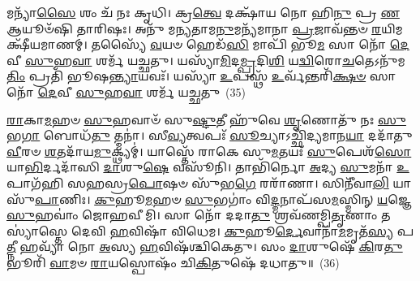 𑌮𑌨𑍍𑌯𑌾᳴\-\ul{𑌸𑍈} 𑌶𑌂 𑌚᳴ 𑌨𑌃 𑌕𑍃𑌧𑌿। 𑌕𑍍𑌰\-\ul{𑌤𑍍𑌵𑍇} 𑌦𑌕𑍍𑌷𑌾᳴𑌯 𑌨𑍋 𑌹𑌿\-\ul{𑌨𑍁} 𑌪𑍍𑌰 \ul{𑌣} 𑌆𑌯𑍂𑍞᳴𑌷𑌿 𑌤𑌾𑌰𑌿𑌷𑌃। 𑌅𑌨𑍁᳴ 𑌮𑌨𑍍𑌯𑌤𑌾𑌮\-\ul{𑌨𑍁}\-𑌮𑌨𑍍𑌯᳴𑌮𑌾𑌨𑌾 \ul{𑌪𑍍𑌰}\-𑌜𑌾𑌵᳴𑌨𑍍𑌤𑍞 \ul{𑌰}\-𑌯𑌿𑌮𑌕𑍍𑌷𑍀᳴𑌯𑌮𑌾𑌣𑌮𑍍। 𑌤𑌸𑍍𑌯𑍈᳴ \ul{𑌵}\-𑌯𑍞 𑌹𑍇𑌡᳴\-\ul{𑌸𑌿} 𑌮𑌾𑌪𑌿᳴ 𑌭𑍂\-\ul{𑌮} 𑌸𑌾 𑌨𑍋᳴ \ul{𑌦𑍇}\-𑌵𑍀 \ul{𑌸𑍁}\-𑌹\-\ul{𑌵𑌾} 𑌶𑌰𑍍𑌮᳴ 𑌯𑌚𑍍𑌛𑌤𑍁। 𑌯𑌸𑍍𑌯𑌾᳴\-\ul{𑌮𑌿}\-𑌦\-\ul{𑌮𑍍𑌪𑍍𑌰}\-𑌦𑌿\-\ul{𑌶𑌿} 𑌯\-\ul{𑌦𑍍𑌵𑌿}\-𑌰𑍋\-\ul{𑌚}\-𑌤𑍇\-𑌽𑌨𑍁᳴𑌮\-\ul{𑌤𑌿𑌂} 𑌪𑍍𑌰𑌤𑌿᳴ 𑌭𑍂𑌷\-\ul{𑌨𑍍𑌤𑍍𑌯𑌾}\-𑌯𑌵𑌃᳴। 𑌯𑌸𑍍𑌯𑌾᳴ \ul{𑌉}\-𑌪𑌸𑍍𑌥᳴ \ul{𑌉}\-𑌰𑍍𑌵᳴𑌨𑍍𑌤𑌰𑌿᳴\-\ul{𑌕𑍍𑌷}\-\-\ul{𑍞} 𑌸𑌾 𑌨𑍋᳴ \ul{𑌦𑍇}\-𑌵𑍀 \ul{𑌸𑍁}\-𑌹\-\ul{𑌵𑌾} 𑌶𑌰𑍍𑌮᳴ 𑌯𑌚𑍍𑌛𑌤𑍁~(35)

\-\ul{𑌰𑌾}\-𑌕𑌾\-\ul{𑌮}\-𑌹𑍞 \ul{𑌸𑍁}\-𑌹𑌵𑌾𑍞᳴ 𑌸𑍁\-\ul{𑌷𑍍𑌟𑍁}\-𑌤𑍀 𑌹𑍁᳴𑌵𑍇 \ul{𑌶𑍃}\-𑌣𑍋𑌤𑍁᳴ 𑌨𑌃 \ul{𑌸𑍁}\-𑌭\-\ul{𑌗𑌾} 𑌬𑍋𑌧᳴\-\ul{𑌤𑍁} 𑌤𑍍𑌮𑌨𑌾॑। 𑌸𑍀\-\ul{𑌵𑍍𑌯}\-𑌤𑍍𑌵𑌪𑌃᳴ \ul{𑌸𑍂}\-𑌚𑍍𑌯𑌾\-𑌽𑌚𑍍𑌛𑌿᳴𑌦𑍍𑌯𑌮𑌾𑌨\-\ul{𑌯𑌾} 𑌦𑌦𑌾᳴𑌤𑍁 \ul{𑌵𑍀}\-𑌰𑍞 \ul{𑌶}\-𑌤𑌦𑌾᳴𑌯\-\ul{𑌮𑍁}\-𑌕𑍍𑌥𑍍𑌯𑌮𑍍॑। 𑌯𑌾𑌸𑍍𑌤𑍇᳴ 𑌰𑌾𑌕𑍇 𑌸𑍁\-\ul{𑌮}\-𑌤𑌯𑌃᳴ \ul{𑌸𑍁}\-𑌪𑍇𑌶᳴\-\ul{𑌸𑍋} 𑌯𑌾\-\ul{𑌭𑌿}\-𑌰𑍍𑌦𑌦𑌾᳴𑌸𑌿 \ul{𑌦𑌾}\-𑌶𑍁\-\ul{𑌷𑍇} 𑌵𑌸𑍂᳴𑌨𑌿। 𑌤𑌾𑌭𑌿᳴𑌰𑍍𑌨𑍋 \ul{𑌅}\-𑌦𑍍𑌯 \ul{𑌸𑍁}\-𑌮𑌨𑌾᳴ \ul{𑌉}\-𑌪𑌾𑌗᳴𑌹𑌿 𑌸𑌹𑌸𑍍𑌰\-\ul{𑌪𑍋}\-𑌷𑍞 𑌸𑍁᳴𑌭\-\ul{𑌗𑍇} 𑌰𑌰𑌾᳴𑌣𑌾। 𑌸𑌿𑌨𑍀᳴𑌵𑌾\-\ul{𑌲𑌿} 𑌯𑌾 𑌸𑍁᳴\-\ul{𑌪𑌾}\-𑌣𑌿𑌃। \ul{𑌕𑍁}\-𑌹𑍂\-\ul{𑌮}\-𑌹𑍞 \ul{𑌸𑍁}\-𑌭𑌗𑌾𑌂॑ 𑌵𑌿\-\ul{𑌦𑍍𑌮}\-𑌨𑌾𑌪᳴𑌸\-\ul{𑌮}\-𑌸𑍍𑌮𑌿𑌨𑍍 \ul{𑌯}\-𑌜𑍍𑌞𑍇 \ul{𑌸𑍁}\-𑌹𑌵𑌾𑌂॑ 𑌜𑍋𑌹𑌵𑍀𑌮𑌿। 𑌸𑌾 𑌨𑍋᳴ 𑌦𑌦𑌾\-\ul{𑌤𑍁} 𑌶𑍍𑌰𑌵᳴𑌣𑌮𑍍𑌪𑌿\-\ul{𑌤𑍃}\-𑌣𑌾𑌂 𑌤𑌸𑍍𑌯𑌾॑𑌸𑍍𑌤𑍇 𑌦𑍇𑌵𑌿 \ul{𑌹}\-𑌵𑌿𑌷𑌾᳴ 𑌵𑌿𑌧𑍇𑌮। \ul{𑌕𑍁}\-𑌹𑍂\-\ul{𑌰𑍍𑌦𑍇}\-𑌵𑌾𑌨𑌾᳴\-\ul{𑌮}\-𑌮𑍃𑌤᳴\-\ul{𑌸𑍍𑌯} 𑌪\-\ul{𑌤𑍍𑌨𑍀} 𑌹𑌵𑍍𑌯𑌾᳴ 𑌨𑍋 \ul{𑌅}\-𑌸𑍍𑌯 \ul{𑌹}\-𑌵𑌿𑌷᳴𑌶𑍍𑌚𑌿𑌕𑍇𑌤𑍁। 𑌸𑌂 \ul{𑌦𑌾}\-𑌶𑍁𑌷𑍇᳴ \ul{𑌕𑌿}\-𑌰\-\ul{𑌤𑍁} 𑌭𑍂𑌰𑌿᳴ \ul{𑌵𑌾}\-𑌮𑍞 \ul{𑌰𑌾}\-𑌯𑌸𑍍𑌪𑍋𑌷𑌂᳴ 𑌚𑌿\-\ul{𑌕𑌿}\-𑌤𑍁𑌷𑍇᳴ 𑌦𑌧𑌾𑌤𑍁॥~(36)

{\anuvakamend[{𑌭𑌾𑌮𑌾᳴\-\ul{𑌸𑍋} 𑌦𑌾\-\ul{𑌤𑌾} 𑌤𑍍𑌵\-\ul{𑌮}\-𑌨𑍍𑌤𑌰𑌿᳴\-\ul{𑌕𑍍𑌷}\-\-\ul{𑍞} 𑌸𑌾 𑌨𑍋᳴ \ul{𑌦𑍇}\-𑌵𑍀 \ul{𑌸𑍁}\-𑌹\-\ul{𑌵𑌾} 𑌶𑌰𑍍𑌮᳴ 𑌯𑌚𑍍𑌛\-\ul{𑌤𑍁} 𑌶𑍍𑌰𑌵᳴\-\ul{𑌣𑌂} 𑌚𑌤𑍁᳴𑌰𑍍𑌵𑌿𑍞𑌶𑌤𑌿𑌶𑍍𑌚}]}%


{\anuvakamend[{𑌵𑌿 𑌵𑌾 \ul{𑌏}\-𑌤𑌸𑍍𑌯𑌾 𑌵𑌾᳴𑌯𑍋 \ul{𑌇}\-𑌮𑍇 𑌵𑍈 \ul{𑌚𑌿}\-𑌤𑍍𑌤\-\ul{𑌞𑍍𑌚𑌾}\-𑌗𑍍𑌨𑌿\-\ul{𑌰𑍍𑌭𑍂}\-𑌤𑌾𑌨𑌾𑌂॑ \ul{𑌦𑍇}\-𑌵𑌾 𑌵𑌾 𑌅᳴𑌭𑍍𑌯𑌾\-\ul{𑌤𑌾}\-𑌨𑌾𑌨𑍃᳴\-\ul{𑌤𑌾}\-𑌷𑌾\-\ul{𑌡𑍍𑌰𑌾}\-𑌷𑍍𑌟𑍍𑌰𑌕𑌾᳴𑌮𑌾\-\ul{𑌯} 𑌦𑍇𑌵𑌿᳴\-\ul{𑌕𑌾} 𑌵𑌾𑌸𑍍𑌤𑍋॑𑌷𑍍𑌪\-\ul{𑌤𑍇} 𑌤𑍍𑌵𑌮᳴𑌗𑍍𑌨𑍇 \ul{𑌬𑍃}\-𑌹𑌦𑍇𑌕𑌾᳴\-𑌦𑌶}]}%

